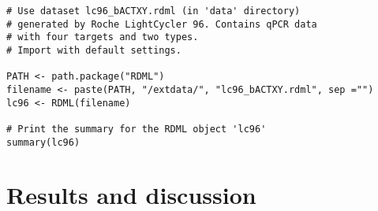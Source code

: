 \documentclass{bioinfo}
\begin{document}
\begin{figure*}
\begin{verbatim}
# Use dataset lc96_bACTXY.rdml (in 'data' directory)
# generated by Roche LightCycler 96. Contains qPCR data
# with four targets and two types.
# Import with default settings.

PATH <- path.package("RDML")
filename <- paste(PATH, "/extdata/", "lc96_bACTXY.rdml", sep ="")
lc96 <- RDML(filename)

# Print the summary for the RDML object 'lc96'
summary(lc96)
\end{verbatim}
\end{figure*}


\section{Results and discussion}

%
%
%
%
%
%

%

\end{document}
